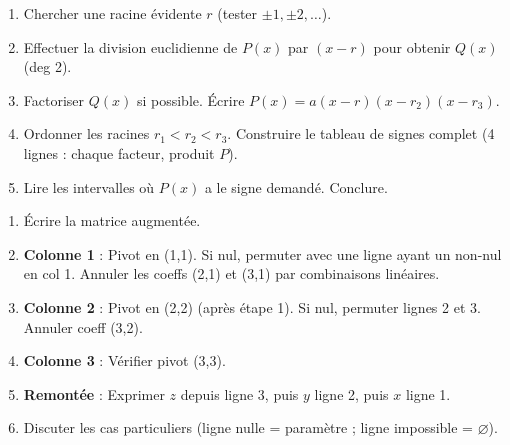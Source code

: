 \documentclass[11pt]{article}
\begin{document}
\begin{bilan}
\begin{methode}
\begin{enumerate}
  \item Chercher une racine évidente $r$ (tester $\pm1, \pm2, \dots$).
  \item Effectuer la division euclidienne de $P(x)$ par $(x-r)$ pour obtenir $Q(x)$ (deg 2).
  \item Factoriser $Q(x)$ si possible. Écrire $P(x)=a(x-r)(x-r_2)(x-r_3)$.
  \item Ordonner les racines $r_1 < r_2 < r_3$. Construire le tableau de signes complet (4 lignes : chaque facteur, produit $P$).
  \item Lire les intervalles où $P(x)$ a le signe demandé. Conclure.
\end{enumerate}
\end{methode}

\begin{methode}
\begin{enumerate}
  \item Écrire la matrice augmentée.
  \item \textbf{Colonne 1} : Pivot en (1,1). Si nul, permuter avec une ligne ayant un non-nul en col 1. Annuler les coeffs (2,1) et (3,1) par combinaisons linéaires.
  \item \textbf{Colonne 2} : Pivot en (2,2) (après étape 1). Si nul, permuter lignes 2 et 3. Annuler coeff (3,2).
  \item \textbf{Colonne 3} : Vérifier pivot (3,3).
  \item \textbf{Remontée} : Exprimer $z$ depuis ligne 3, puis $y$ ligne 2, puis $x$ ligne 1.
  \item Discuter les cas particuliers (ligne nulle = paramètre ; ligne impossible = $\varnothing$).
\end{enumerate}
\end{methode}

\end{bilan}
\end{document}
